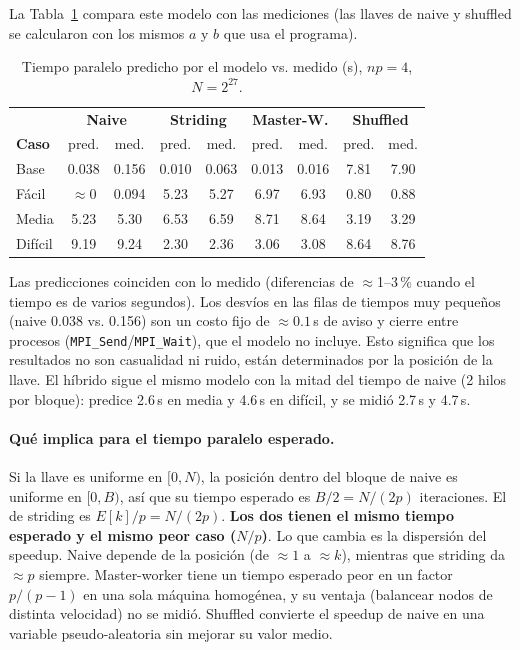 \documentclass[11pt,letterpaper]{article}
\begin{document}
La Tabla~\ref{tab:modelo} compara este modelo con las mediciones
(las llaves de naive y shuffled se calcularon con los mismos $a$ y
$b$ que usa el programa).

\begin{table}[H]
\centering
\small
\begin{tabular}{lcccccccc}
\toprule
 & \multicolumn{2}{c}{\textbf{Naive}} & \multicolumn{2}{c}{\textbf{Striding}} & \multicolumn{2}{c}{\textbf{Master-W.}} & \multicolumn{2}{c}{\textbf{Shuffled}} \\
\textbf{Caso} & pred. & med. & pred. & med. & pred. & med. & pred. & med. \\
\midrule
Base    & 0.038 & 0.156 & 0.010 & 0.063 & 0.013 & 0.016 & 7.81 & 7.90 \\
Fácil   & $\approx0$ & 0.094 & 5.23 & 5.27 & 6.97 & 6.93 & 0.80 & 0.88 \\
Media   & 5.23 & 5.30 & 6.53 & 6.59 & 8.71 & 8.64 & 3.19 & 3.29 \\
Difícil & 9.19 & 9.24 & 2.30 & 2.36 & 3.06 & 3.08 & 8.64 & 8.76 \\
\bottomrule
\end{tabular}
\caption{Tiempo paralelo predicho por el modelo vs. medido (s), $np=4$, $N=2^{27}$.}
\label{tab:modelo}
\end{table}

Las predicciones coinciden con lo medido (diferencias de $\approx$1--3\,\%
cuando el tiempo es de varios segundos). Los desvíos en las filas de
tiempos muy pequeños (naive 0.038 vs. 0.156) son un costo fijo de
$\approx0.1$\,s de aviso y cierre entre procesos
(\texttt{MPI\_Send}/\texttt{MPI\_Wait}), que el modelo no incluye. Esto
significa que los resultados no son casualidad ni ruido, están
determinados por la posición de la llave. El híbrido sigue el mismo modelo con la mitad
del tiempo de naive (2 hilos por bloque): predice 2.6\,s en media y 4.6\,s en
difícil, y se midió 2.7\,s y 4.7\,s.

\paragraph{Qué implica para el tiempo paralelo esperado.} Si la llave es
uniforme en $[0,N)$, la posición dentro del bloque de naive es uniforme
en $[0,B)$, así que su tiempo esperado es $B/2=N/(2p)$ iteraciones. El de
striding es $E[k]/p=N/(2p)$. \textbf{Los dos tienen el mismo tiempo
esperado y el mismo peor caso ($N/p$)}. Lo que cambia es la dispersión
del speedup. Naive depende de la posición (de $\approx1$ a $\approx k$),
mientras que striding da $\approx p$ siempre. Master-worker tiene un
tiempo esperado peor en un factor $p/(p-1)$ en una sola máquina
homogénea, y su ventaja (balancear nodos de distinta velocidad) no se
midió. Shuffled convierte el speedup de naive en una variable
pseudo-aleatoria sin mejorar su valor medio.
\end{document}
